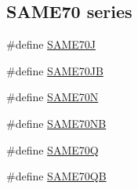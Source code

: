 \subsection*{S\+A\+M\+E70 series}
\begin{DoxyCompactItemize}
\item 
\#define \mbox{\hyperlink{group__sam__part__macros__group_gac93b02af1231b0a98fe321369ddc7518}{S\+A\+M\+E70J}}
\item 
\#define \mbox{\hyperlink{group__sam__part__macros__group_gaae0e6f6fcaa48e35111517b579509e64}{S\+A\+M\+E70\+JB}}
\item 
\#define \mbox{\hyperlink{group__sam__part__macros__group_gaaf095995f64c3f7f90b0bc0bba4f02c1}{S\+A\+M\+E70N}}
\item 
\#define \mbox{\hyperlink{group__sam__part__macros__group_ga334dbf79ff94d8bf76c1fae1bebb36a0}{S\+A\+M\+E70\+NB}}
\item 
\#define \mbox{\hyperlink{group__sam__part__macros__group_gabff43edc4525eee01f0a484e6e3996e9}{S\+A\+M\+E70Q}}
\item 
\#define \mbox{\hyperlink{group__sam__part__macros__group_ga1a873ec232758ffa5fae2ba4f925f8f9}{S\+A\+M\+E70\+QB}}
\end{DoxyCompactItemize}
